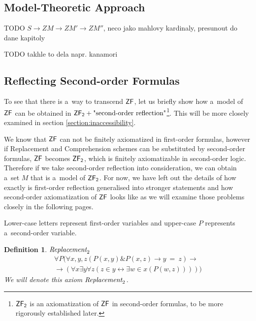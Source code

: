 \documentclass[12pt,a4paper]{article}
\newtheorem{definition}[theorem]{Definition}
\renewcommand{\iff}{\leftrightarrow}
\newcommand{\then}{\rightarrow}
\begin{document}
\subsection{Model-Theoretic Approach}

TODO $S \then ZM \then ZM' \then ZM''$, neco jako mahlovy kardinaly, presunout do dane kapitoly

TODO takhle to dela napr. kanamori

\subsection{Reflecting Second-order Formulas}


To see that there is a~way to transcend $\sf{ZF}$, let us briefly show how a~model of $\sf{ZF}$ can be obtained in $\sf{ZF}_2 + \mbox{"second-order reflection"}$\footnote{$\sf{ZF}_2$ is an axiomatization of $\sf{ZF}$ in second-order formulas, to be more rigorously established later.}. This will be more closely examined in section \ref{section:inaccessibility}.

We know that $\sf{ZF}$ can not be finitely axiomatized in first-order formulas, however if Replacement and Comprehension schemes can be substituted by second-order formulas, $\sf{ZF}$ becomes $\sf{ZF}_2$, which is finitely axiomatizable in second-order logic. Therefore if we take second-order reflection into consideration, we can obtain a~set $M$ that is a~model of $\sf{ZF}_2$. For now, we have left out the details of how exactly is first-order reflection generalised into stronger statements and how second-order axiomatization of $\sf{ZF}$ looks like as we will examine those problems closely in the following pages. 


Lower-case letters represent first-order variables and upper-case $P$ represents a~second-order variable. \cite{Shapiro87}
\begin{definition}{$\emph{Replacement}_2$}\label{def:replacement_2}\\
\begin{equation}
\begin{split}
\forall P (\forall x, y, z (P(x, y) \& P(x, z) \then y\ =\ z) \then
\\
\then (\forall x \exists y \forall z (z \in y \iff \exists w \in x (P(w, z)))))
\end{split}
\end{equation}
We will denote this axiom $\emph{Replacement}_2$.
\end{definition}
\end{document}

